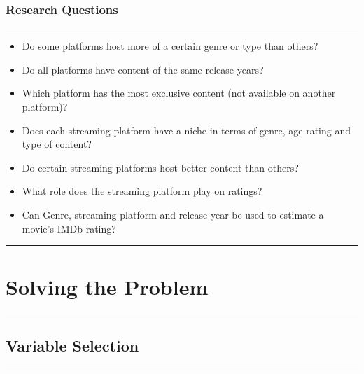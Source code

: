 \documentclass[
]{article}
\providecommand{\tightlist}{%
  \setlength{\itemsep}{0pt}\setlength{\parskip}{0pt}}
\begin{document}
\hypertarget{research-questions}{%
\subsubsection{Research Questions}\label{research-questions}}

\begin{center}\rule{0.5\linewidth}{0.5pt}\end{center}

\begin{itemize}
\tightlist
\item
  Do some platforms host more of a certain genre or type than others?
\item
  Do all platforms have content of the same release years?
\item
  Which platform has the most exclusive content (not available on
  another platform)?
\item
  Does each streaming platform have a niche in terms of genre, age
  rating and type of content?
\item
  Do certain streaming platforms host better content than others?
\item
  What role does the streaming platform play on ratings?
\item
  Can Genre, streaming platform and release year be used to estimate a
  movie's IMDb rating?
\end{itemize}

\begin{center}\rule{0.5\linewidth}{0.5pt}\end{center}

\hypertarget{solving-the-problem}{%
\section{Solving the Problem}\label{solving-the-problem}}

\begin{center}\rule{0.5\linewidth}{0.5pt}\end{center}

\hypertarget{variable-selection}{%
\subsection{Variable Selection}\label{variable-selection}}

\begin{center}\rule{0.5\linewidth}{0.5pt}\end{center}
\end{document}
